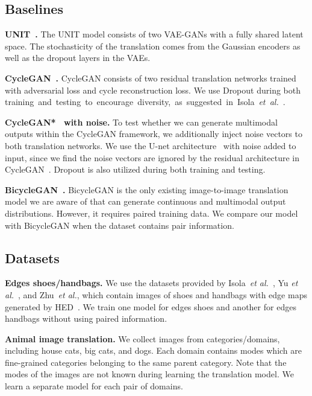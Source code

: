 \documentclass[runningheads]{llncs}
\newcommand{\vpara}[1]{\vspace{0.05in}\noindent\textbf{#1}}
\def\etal{\emph{et al.}\xspace}
\begin{document}
	
\subsection{Baselines}
\vpara{UNIT~\cite{liu2017unsupervised}.} The UNIT model consists of two VAE-GANs with a fully shared latent space. The stochasticity of the translation comes from the Gaussian encoders as well as the dropout layers in the VAEs.
	
\vpara{CycleGAN~\cite{zhu2017unpaired}.} CycleGAN consists of two residual translation networks trained with adversarial loss and cycle reconstruction loss. We use Dropout during both \mbox{training and testing to encourage diversity, as suggested in Isola \etal~\cite{isola2017image}.}
	
	\vpara{CycleGAN*~\cite{zhu2017unpaired} with noise.} To test whether we can generate multimodal outputs within the CycleGAN framework, we additionally inject noise vectors to both translation networks. We use the U-net architecture~\cite{zhu2017toward} with noise added to input, since we find the noise vectors are ignored by the residual architecture in CycleGAN~\cite{zhu2017unpaired}. Dropout is also utilized during both training and testing.
	


	\vpara{BicycleGAN~\cite{zhu2017toward}.} BicycleGAN is the only existing image-to-image translation model we are aware of that can generate continuous and multimodal output distributions. However, it requires paired training data. We compare our model with BicycleGAN when the dataset contains pair information. 






	\subsection{Datasets}


\vpara{Edges  shoes/handbags.} We use the datasets provided by Isola~\etal~\cite{isola2017image}, Yu \etal~\cite{yu2014fine}, and Zhu~\etal\cite{zhu2016generative}, which contain images of shoes and handbags with edge maps generated by HED~\cite{xie2015holistically}. We train one model for edges  shoes and another for edges  handbags without using paired information.
	
	\vpara{Animal image translation.} We collect images from  categories/domains, including house cats, big cats, and dogs. Each domain contains  modes which are fine-grained categories belonging to the same parent category. Note that the modes of the images are not known during learning the translation model. 
We learn a separate model for each pair of domains. 
	
\end{document}
